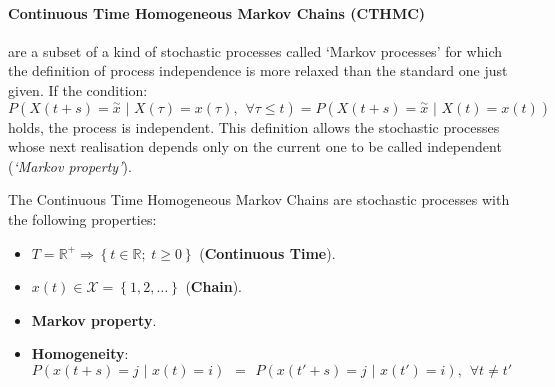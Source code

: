 \documentclass[12pt,a4paper]{article}
\begin{document}
\paragraph{Continuous Time Homogeneous Markov Chains (CTHMC)} are a subset of a kind of stochastic processes called `Markov processes' for which the definition of process independence is more relaxed than the standard one just given. If the condition:
$$
P\left(X\left(t+s\right)=\overset{\sim}{x}\hspace{4pt}|\hspace{4pt}X\left(\tau\right)=
x\left(\tau\right),\hspace{5pt}\forall\tau\leq t\right)=
P\left(X\left(t+s\right)=\overset{\sim}{x} \hspace{4pt}|\hspace{4pt} X\left(t\right)=x\left(t\right)\right)
$$
holds, the process is independent. This definition allows the stochastic processes whose next realisation depends only on the current one to be called independent (\emph{`Markov property'}).

\bigskip
\noindent
The Continuous Time Homogeneous Markov Chains are stochastic processes with the following properties:
\begin{itemize}
\item $T=\mathbb{R}^+\Rightarrow\left\lbrace t\in\mathbb{R};\hspace{3pt}t\geq 0\right\rbrace $ (\textbf{Continuous Time}).
\item $x(t)\in \mathcal{X}=\left\lbrace 1,2,\dots\right\rbrace$ (\textbf{Chain}).
\item \textbf{Markov property}.
\item \textbf{Homogeneity}: 
$$
P\left(x\left(t+s\right)=j\hspace{4pt}|\hspace{4pt}x\left(t\right)=i\right)
\hspace{5pt}=\hspace{5pt}
P\left(x\left(t'+s\right)=j\hspace{4pt}|\hspace{4pt}x\left(t'\right)=i\right),\hspace{5pt}\forall t\neq t'
$$
\end{itemize} 
\end{document}
